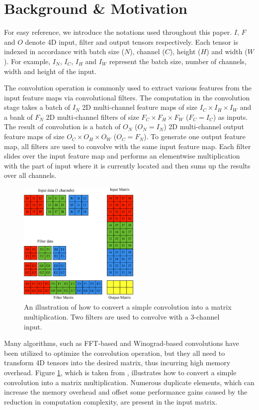 
\section{Background \& Motivation}
For easy reference, we introduce the notations used throughout this paper. $I$, $F$ and $O$ denote 4D input, filter and output
tensors respectively. Each tensor is indexed in accordance with batch size ($N$), channel ($C$), height ($H$) and width ($W$). For example, $I_N$,
$I_C$, $I_H$ and $I_W$ represent the batch size, number of channels, width and height of the input.

The convolution operation is commonly used to extract various features from the input feature maps via convolutional filters. The computation
in the convolution stage takes a batch of $I_N$ 2D multi-channel feature maps of size $I_C \times I_H \times I_W$ and a bank of $F_N$ 2D
multi-channel filters of size $F_C \times F_H \times F_W$ ($F_C = I_C$) as inputs. The result of convolution is a batch of $O_N$
($O_N=I_N$) 2D multi-channel output feature maps of size $O_C \times O_H \times O_W$ ($O_C=F_N$). To generate one output feature map, all
filters are used to convolve with the same input feature map. Each filter slides over the input feature map and performs an elementwise
multiplication with the part of input where it is currently located  and then sums up the results over all channels.

\begin{figure}
\centering
  \includegraphics[width=0.75\columnwidth,height=6cm]{./figure/convlowering.eps}
  \caption{An illustration of how to convert a simple convolution into a matrix multiplication. Two filters are used to convolve with a 3-channel input.}
  \label{fig:convlowering}
\end{figure}

Many algorithms, such as FFT-based and Winograd-based convolutions have been utilized to optimize the convolution operation, but they all need to
transform 4D tensors into the desired matrix, thus incurring high memory overhead. Figure \ref{fig:convlowering}, which is taken from
\cite{ChetlurWVCTCS14}, illustrates how to convert a simple convolution into a matrix multiplication. Numerous duplicate elements, which can increase the memory overhead and offset some performance gains caused by the reduction in computation complexity, are present in the input matrix.

